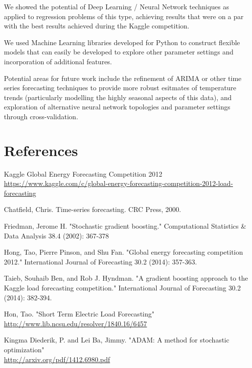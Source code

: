 \documentclass{article} %
\begin{document}
We showed the potential of Deep Learning / Neural Network techniques as applied to regression problems of this type, achieving results that were on a par with the best results achieved during the Kaggle competition.

We used Machine Learning libraries developed for Python to construct flexible models that can easily be developed to explore other parameter settings and incorporation of additional features.

Potential areas for future work include the refinement of ARIMA or other time series forecasting techniques to provide more robust esitmates of temperature trends (particularly modelling the highly seasonal aspects of this data), and exploration of alternative neural network topologies and parameter settings through cross-validation.

\section*{References}
Kaggle Global Energy Forecasting Competition 2012 \\
\url{https://www.kaggle.com/c/global-energy-forecasting-competition-2012-load-forecasting}

Chatfield, Chris. Time-series forecasting. CRC Press, 2000.

Friedman, Jerome H. "Stochastic gradient boosting." Computational Statistics \& Data Analysis 38.4 (2002): 367-378

Hong, Tao, Pierre Pinson, and Shu Fan. "Global energy forecasting competition 2012." International Journal of Forecasting 30.2 (2014): 357-363.

Taieb, Souhaib Ben, and Rob J. Hyndman. "A gradient boosting approach to the Kaggle load forecasting competition." International Journal of Forecasting 30.2 (2014): 382-394.

Hon, Tao. "Short Term Electric Load Forecasting" \\
\url{http://www.lib.ncsu.edu/resolver/1840.16/6457}

Kingma Diederik, P. and Lei Ba, Jimmy. "ADAM: A method for stochastic optimization" \\
\url{http://arxiv.org/pdf/1412.6980.pdf}
\end{document}
